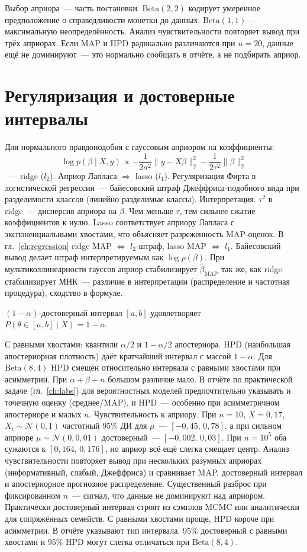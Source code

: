 Выбор априора~--- часть постановки. $\mathrm{Beta}(2,2)$ кодирует умеренное предположение о справедливости монетки до данных. $\mathrm{Beta}(1,1)$~--- максимальную неопределённость. Анализ чувствительности повторяет вывод при трёх априорах. Если MAP и HPD радикально различаются при $n=20$, данные ещё не доминируют~--- это нормально сообщать в отчёте, а не подбирать априор.

\section{Регуляризация и достоверные интервалы}

Для нормального правдоподобия с гауссовым априором на коэффициенты: \[ \log p(\beta\mid X,y)\propto -\frac1{2\sigma^2}\|y-X\beta\|_2^2-\frac1{2\tau^2}\|\beta\|_2^2 \] ~--- ridge ($l_2$). Априор Лапласа $\Rightarrow$ lasso ($l_1$).
Регуляризация Фирта в логистической регрессии~--- байесовский штраф Джеффриса-подобного вида при разделимости классов (линейно разделимые классы).
Интерпретация. $\tau^2$ в ridge~--- дисперсия априора на $\beta$. Чем меньше $\tau$, тем сильнее сжатие коэффициентов к нулю.
Lasso соответствует априору Лапласа с экспоненциальными хвостами, что объясняет разреженность MAP-оценок.
В гл.~\ref{ch:regression} ridge MAP $\Leftrightarrow$ $l_2$-штраф, lasso MAP $\Leftrightarrow$ $l_1$. Байесовский вывод делает штраф
интерпретируемым как $\log p(\beta)$. При мультиколлинеарности гауссов априор стабилизирует $\hat\beta_{\mathrm{MAP}}$ так же, как ridge стабилизирует МНК~--- различие в интерпретации (распределение и частотная процедура), сходство в формуле.

\begin{definition}
$(1-\alpha)$-достоверный интервал $[a,b]$ удовлетворяет $P(\theta\in[a,b]\mid X)=1-\alpha$.
\end{definition}

С равными хвостами: квантили $\alpha/2$ и $1-\alpha/2$ апостериора.
HPD (наибольшая апостериорная плотность) даёт кратчайший интервал с массой $1-\alpha$.
Для $\mathrm{Beta}(8,4)$ HPD смещён относительно интервала с равными хвостами при асимметрии. При $\alpha+\beta+n$ большом различие мало.
В отчёте по практической задаче (гл.~\ref{ch:labs}) для вероятностных моделей предпочтительно указывать и точечную оценку (среднее/MAP), и HPD~--- особенно при асимметричном апостериоре и малых $n$.
Чувствительность к априору. При $n=10$, $\bar X=0{,}17$, $X_i\sim\mathcal{N}(0,1)$ частотный 95\% ДИ для $\mu$~--- $[-0{,}45,\,0{,}78]$, а при сильном априоре $\mu\sim\mathcal{N}(0,0{,}01)$ достоверный~--- $[-0{,}002,\,0{,}03]$. При $n=10^5$ оба сужаются к $[0{,}164,\,0{,}176]$, но априор всё ещё слегка смещает центр.
Анализ чувствительности повторяет вывод при нескольких разумных априорах (информативный, слабый, Джеффриса) и сравнивает MAP, достоверный интервал и апостериорное прогнозное распределение. Существенный разброс при фиксированном $n$~--- сигнал, что данные не доминируют над априором.
Практически достоверный интервал строят из сэмплов MCMC или аналитически для сопряжённых семейств. С равными хвостами проще, HPD короче при асимметрии. В отчёте указывают тип интервала. 95\% достоверный с равными хвостами и 95\% HPD могут слегка отличаться при $\mathrm{Beta}(8,4)$.

